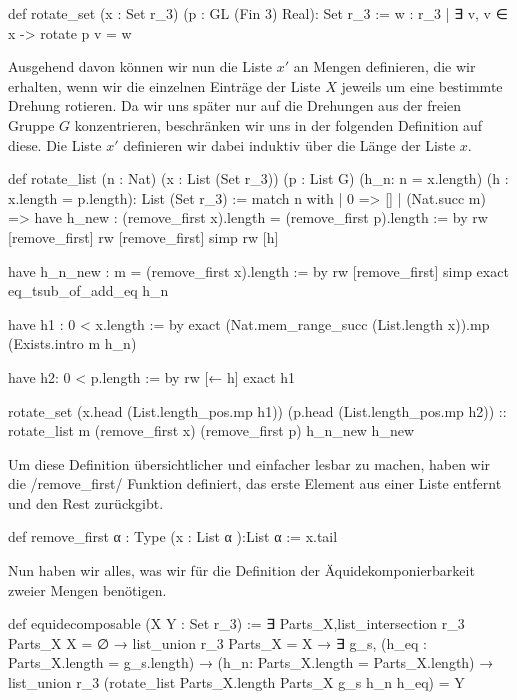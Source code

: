 \documentclass[10pt]{article}
\begin{document}
\begin{leancode}
def rotate_set (x : Set r_3) (p : GL (Fin 3) Real): Set r_3 :=
  {w : r_3  | ∃ v, v ∈ x -> rotate p v = w}
\end{leancode}
\noindent Ausgehend davon können wir nun die Liste $x'$ an Mengen definieren, die wir erhalten, wenn wir die einzelnen Einträge der Liste $X$ jeweils um eine bestimmte Drehung rotieren. Da wir uns später nur auf die Drehungen aus der freien Gruppe $G$ konzentrieren, beschränken wir uns in der folgenden Definition auf diese. Die Liste $x'$ definieren wir dabei induktiv über die Länge der Liste $x$.
\begin{leancode}
def rotate_list (n : Nat) (x : List (Set r_3)) (p : List G) (h_n: n = x.length) 
(h : x.length = p.length): List (Set r_3) :=
  match n with
  | 0 => []
  | (Nat.succ m) =>
      have h_new : (remove_first x).length = (remove_first p).length := by
        rw [remove_first]
        rw [remove_first]
        simp
        rw [h]

      have h_n_new : m = (remove_first x).length := by
        rw [remove_first]
        simp
        exact eq_tsub_of_add_eq h_n

      have h1 : 0 < x.length :=  by
        exact (Nat.mem_range_succ (List.length x)).mp (Exists.intro m h_n)

      have h2: 0 < p.length := by
        rw [← h]
        exact h1

      rotate_set (x.head (List.length_pos.mp h1)) (p.head (List.length_pos.mp h2))
                    :: rotate_list m (remove_first x) (remove_first p) h_n_new h_new
\end{leancode}
\noindent Um diese Definition übersichtlicher und einfacher lesbar zu machen, haben wir die \lean/remove_first/ Funktion definiert, das erste Element aus einer Liste entfernt und den Rest zurückgibt.
\begin{leancode}
def remove_first {α : Type} (x : List α ):List α :=
  x.tail
\end{leancode}
\noindent Nun haben wir alles, was wir für die Definition der Äquidekomponierbarkeit zweier Mengen benötigen.
\begin{leancode}
def equidecomposable (X Y : Set r_3) :=
  ∃ Parts_X,list_intersection r_3 Parts_X X = ∅ →
  list_union r_3 Parts_X = X →
  ∃ g_s, (h_eq : Parts_X.length = g_s.length) → (h_n: Parts_X.length = Parts_X.length) →
  list_union r_3 (rotate_list Parts_X.length Parts_X g_s h_n h_eq) = Y
\end{leancode}
\end{document}
